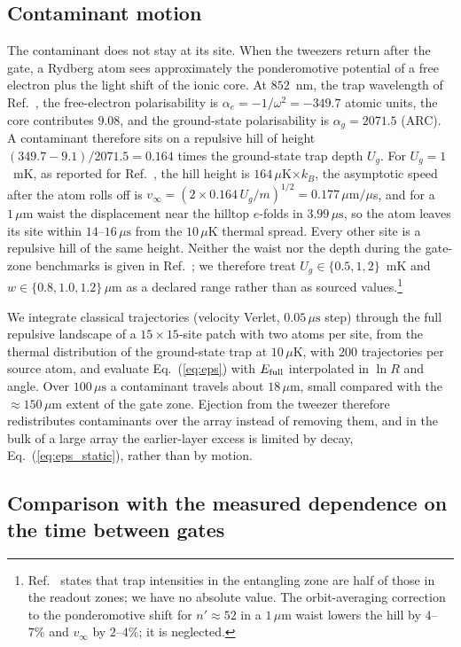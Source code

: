 \documentclass[aps,pra,twocolumn,superscriptaddress,longbibliography,floatfix]{revtex4-2}
\newcommand{\um}{\,\mu\mathrm{m}}
\newcommand{\us}{\,\mu\mathrm{s}}
\begin{document}
\subsection{Contaminant motion}

The contaminant does not stay at its site. When the tweezers return after the gate, a Rydberg atom sees approximately the ponderomotive potential of a free electron plus the light shift of the ionic core. At $852$~nm, the trap wavelength of Ref.~\cite{Bluvstein2026}, the free-electron polarisability is $\alpha_e=-1/\omega^2=-349.7$ atomic units, the core contributes $9.08$, and the ground-state polarisability is $\alpha_g=2071.5$ (ARC). A contaminant therefore sits on a repulsive hill of height $(349.7-9.1)/2071.5=0.164$ times the ground-state trap depth $U_g$. For $U_g=1$~mK, as reported for Ref.~\cite{Evered2023}, the hill height is $164\,\mu$K$\times k_B$, the asymptotic speed after the atom rolls off is $v_\infty=(2\times0.164\,U_g/m)^{1/2}=0.177\um/\mu$s, and for a $1\um$ waist the displacement near the hilltop $e$-folds in $3.99\us$, so the atom leaves its site within $14$--$16\us$ from the $10\,\mu$K thermal spread. Every other site is a repulsive hill of the same height. Neither the waist nor the depth during the gate-zone benchmarks is given in Ref.~\cite{Bluvstein2026}; we therefore treat $U_g\in\{0.5,1,2\}$~mK and $w\in\{0.8,1.0,1.2\}\um$ as a declared range rather than as sourced values.\footnote{Ref.~\cite{Bluvstein2026} states that trap intensities in the entangling zone are half of those in the readout zones; we have no absolute value. The orbit-averaging correction to the ponderomotive shift for $n'\approx52$ in a $1\um$ waist lowers the hill by $4$--$7\%$ and $v_\infty$ by $2$--$4\%$; it is neglected.}

We integrate classical trajectories (velocity Verlet, $0.05\us$ step) through the full repulsive landscape of a $15\times15$-site patch with two atoms per site, from the thermal distribution of the ground-state trap at $10\,\mu$K, with 200 trajectories per source atom, and evaluate Eq.~(\ref{eq:eps}) with $E_{\rm full}$ interpolated in $\ln R$ and angle. Over $100\us$ a contaminant travels about $18\um$, small compared with the $\approx150\um$ extent of the gate zone. Ejection from the tweezer therefore redistributes contaminants over the array instead of removing them, and in the bulk of a large array the earlier-layer excess is limited by decay, Eq.~(\ref{eq:eps_static}), rather than by motion.

\subsection{Comparison with the measured dependence on the time between gates}
\end{document}
